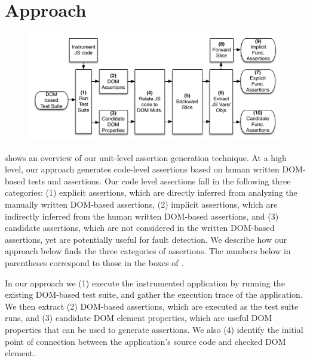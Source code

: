 \section{Approach} \label{Sec:approach}
\begin{figure}[!t]
  \centering
  \includegraphics[width=1\hsize]{fig/approachDiagram}
  \vspace{-0.3in} 
  \label{Fig:approachDiagram}
  \vspace{-0.2in} 
\end{figure}

 shows an overview of our unit-level assertion generation technique.
At a high level, our approach generates code-level assertions based on human written DOM-based tests and assertions. Our code level assertions fall in the following three categories: (1) explicit assertions, which are directly inferred from analyzing the manually written DOM-based assertions, (2) implicit assertions, which are indirectly inferred from the human written DOM-based assertions, and (3) candidate assertions, which are not considered in the written DOM-based assertions, yet are potentially useful for fault detection. We describe how our approach below finds the three categories of assertions. The numbers below in parentheses correspond to those in the boxes of .

In our approach we (1) execute the instrumented application by running the existing DOM-based test suite, and gather the execution trace of the application. We then extract (2) DOM-based assertions, which are executed as the test suite runs, and (3) candidate DOM element properties, which are useful DOM properties that can be used to generate assertions. We also (4) identify the initial point of connection between the application's source code and checked DOM element.

